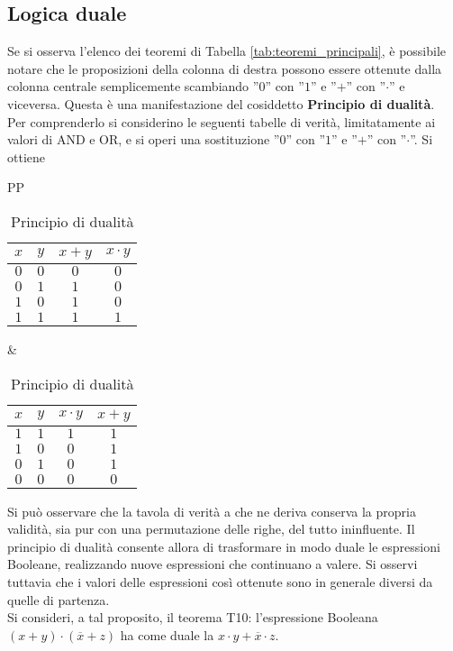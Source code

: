 \documentclass[a4paper]{extarticle}
\newcommand{\quotes}[1]{''#1''}
\begin{document}
\subsection{Logica duale}
Se si osserva l’elenco dei teoremi di Tabella \ref{tab:teoremi_principali}, è possibile notare che le proposizioni della colonna di destra possono essere ottenute dalla colonna centrale semplicemente scambiando \quotes{\(0\)} con \quotes{\(1\)} e \quotes{\(+\)} con \quotes{\(\cdot\)} e viceversa.
Questa è una manifestazione del cosiddetto \textbf{Principio di dualità}.\\
Per comprenderlo si considerino le seguenti tabelle di verità, limitatamente ai valori di AND e OR, e si operi una sostituzione \quotes{\(0\)} con \quotes{\(1\)} e \quotes{\(+\)} con \quotes{\(\cdot\)}. Si ottiene

\begin{table}[H]
    \centering
    \begin{tabularx}{\textwidth}{PP}
        {
            \begin{tabularx}{0.45 \textwidth}{cc|cc}
                 \(x\) & \(y\) & \(x + y\) & \(x \cdot y\)\\
                 \hline
                 \(0\) & \(0\) & \(0\) & \(0\)\\
                 \(0\) & \(1\) & \(1\) & \(0\)\\
                 \(1\) & \(0\) & \(1\) & \(0\)\\
                 \(1\) & \(1\) & \(1\) & \(1\)\\
            \end{tabularx}
        }
        &
        {
            \begin{tabularx}{0.45 \textwidth}{cc|cc}
                 \(x\) & \(y\) & \(x \cdot y\) & \(x + y\)\\
                 \hline
                 \(1\) & \(1\) & \(1\) & \(1\)\\
                 \(1\) & \(0\) & \(0\) & \(1\)\\
                 \(0\) & \(1\) & \(0\) & \(1\)\\
                 \(0\) & \(0\) & \(0\) & \(0\)\\
            \end{tabularx}
        }
    \end{tabularx}
    \caption{Principio di dualità}
    \label{tab:principio_dualita}
\end{table}

\noindent
Si può osservare che la tavola di verità a che ne deriva conserva la propria validità, sia pur con una permutazione delle righe, del tutto ininfluente. Il principio di dualità consente allora di trasformare in modo duale le espressioni Booleane, realizzando nuove espressioni che continuano a valere. Si osservi tuttavia che i valori delle espressioni così ottenute sono in generale diversi da quelle di partenza.\\
Si consideri, a tal proposito, il teorema T10: l’espressione Booleana \((x + y) \cdot (\overline{x} + z)\) ha come duale la \(x \cdot y + \overline{x} \cdot z\).
\end{document}
